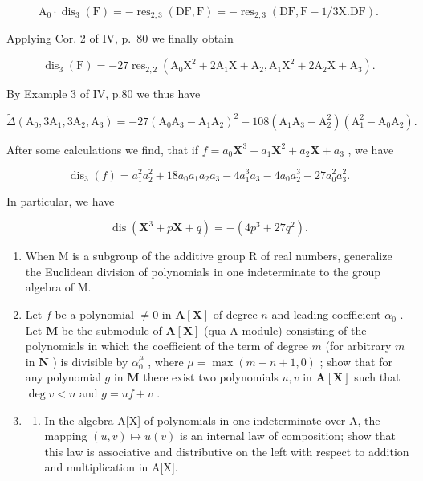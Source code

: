 \[
\mathrm{A} _ {0} \cdot \operatorname{dis} _ {3} (\mathrm{F}) = - \operatorname{res} _ {2, 3} (\mathrm{DF}, \mathrm{F}) = - \operatorname{res} _ {2, 3} (\mathrm{DF}, \mathrm{F} - 1 / 3 \mathrm{X}. \mathrm{DF}).
\]

Applying Cor. 2 of IV, p.~80 we finally obtain

\[
\operatorname{dis} _ {3} (\mathrm{F}) = - 2 7 \operatorname{res} _ {2, 2} \left(\mathrm{A} _ {0} \mathrm{X} ^ {2} + 2 \mathrm{A} _ {1} \mathrm{X} + \mathrm{A} _ {2}, \mathrm{A} _ {1} \mathrm{X} ^ {2} + 2 \mathrm{A} _ {2} \mathrm{X} + \mathrm{A} _ {3}\right).
\]

By Example 3 of IV, p.80 we thus have

\[
\tilde {\Delta} \left(\mathrm{A} _ {0}, 3 \mathrm{A} _ {1}, 3 \mathrm{A} _ {2}, \mathrm{A} _ {3}\right) = - 2 7 \left(\mathrm{A} _ {0} \mathrm{A} _ {3} - \mathrm{A} _ {1} \mathrm{A} _ {2}\right) ^ {2} - 1 0 8 \left(\mathrm{A} _ {1} \mathrm{A} _ {3} - \mathrm{A} _ {2} ^ {2}\right) \left(\mathrm{A} _ {1} ^ {2} - \mathrm{A} _ {0} \mathrm{A} _ {2}\right).
\]

After some calculations we find, that if \(f = a_0\mathbf{X}^3 + a_1\mathbf{X}^2 + a_2\mathbf{X} + a_3\) , we have

\[
\operatorname{dis} _ {3} (f) = a _ {1} ^ {2} a _ {2} ^ {2} + 1 8 a _ {0} a _ {1} a _ {2} a _ {3} - 4 a _ {1} ^ {3} a _ {3} - 4 a _ {0} a _ {2} ^ {3} - 2 7 a _ {0} ^ {2} a _ {3} ^ {2}.
\]

In particular, we have

\[
\operatorname{dis} \left(\mathbf {X} ^ {3} + p \mathbf {X} + q\right) = - \left(4 p ^ {3} + 2 7 q ^ {2}\right).
\]

\BourbakiExercises

\BourbakiExerciseGroup

\begin{enumerate}
\def\labelenumi{\arabic{enumi})}
\item
  When M is a subgroup of the additive group R of real numbers, generalize the Euclidean division of polynomials in one indeterminate to the group algebra of M.
\item
  Let \(f\) be a polynomial \(\neq 0\) in \(\mathbf{A}[\mathbf{X}]\) of degree \(n\) and leading coefficient \(\alpha_0\) . Let \(\mathbf{M}\) be the submodule of \(\mathbf{A}[\mathbf{X}]\) (qua A-module) consisting of the polynomials in which the coefficient of the term of degree \(m\) (for arbitrary \(m\) in \(\mathbf{N}\) ) is divisible by \(\alpha_0^\mu\) , where \(\mu = \max(m - n + 1, 0)\) ; show that for any polynomial \(g\) in \(\mathbf{M}\) there exist two polynomials \(u, v\) in \(\mathbf{A}[\mathbf{X}]\) such that \(\deg v < n\) and \(g = uf + v\) .
\item
  \begin{enumerate}
  \def\labelenumii{\alph{enumii})}
  \tightlist
  \item
    In the algebra A{[}X{]} of polynomials in one indeterminate over A, the mapping \((u,v)\mapsto u(v)\) is an internal law of composition; show that this law is associative and distributive on the left with respect to addition and multiplication in A{[}X{]}.
  \end{enumerate}
\end{enumerate}

